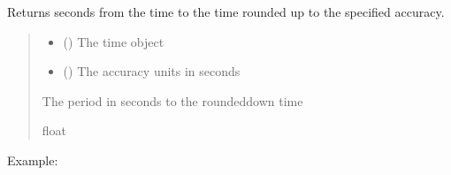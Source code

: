 \documentclass[letterpaper,10pt,english]{sphinxmanual}
\begin{document}
\begin{fulllineitems}
\label{\detokenize{api_core:amw.core.utils.time_floor_dist}}
\pysigstartsignatures
{}
\pysigstopsignatures
\sphinxAtStartPar
Returns seconds from the time to the time rounded up to the specified accuracy.
\begin{quote}\begin{description}
\begin{itemize}
\item {} 
\sphinxAtStartPar
{} () \textendash{} The time object

\item {} 
\sphinxAtStartPar
{} () \textendash{} The accuracy units in seconds

\end{itemize}

\sphinxAtStartPar
The period in seconds to the rounded\sphinxhyphen{}down time

\sphinxAtStartPar
float

\end{description}\end{quote}

\sphinxAtStartPar
Example:

\begin{sphinxVerbatim}[commandchars=\\\{\}]
    
         
 
 
\end{sphinxVerbatim}

\end{fulllineitems}
\end{document}
